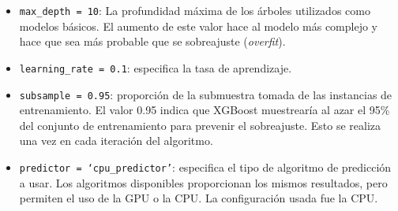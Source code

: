 \begin{description}
\begin{itemize}
		\item \texttt{max\_depth = 10}: La profundidad máxima de los árboles utilizados como modelos básicos. El aumento de este valor hace al modelo más complejo y hace que sea más probable que se sobreajuste (\textit{overfit}).
		\item \texttt{learning\_rate = 0.1}: especifica la tasa de aprendizaje.
		\item \texttt{subsample = 0.95}: proporción de la submuestra tomada de las instancias de entrenamiento. El valor 0.95 indica que XGBoost muestrearía al azar el 95\% del conjunto de entrenamiento para prevenir el sobreajuste. Esto se realiza una vez en cada iteración del algoritmo.
 		\item \texttt{predictor = `cpu\_predictor'}: especifica el tipo de algoritmo de predicción a usar. Los algoritmos disponibles proporcionan los mismos resultados, pero permiten el uso de la GPU o la CPU. La configuración usada fue la CPU.
	\end{itemize}
\end{description}


